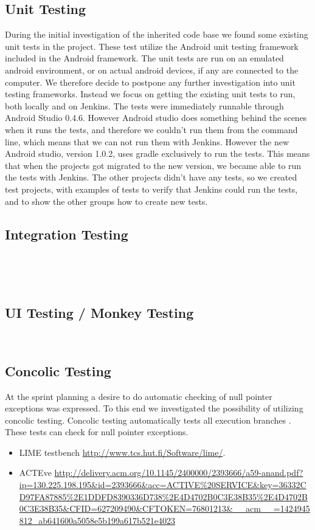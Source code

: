 \subsection{Unit Testing}
During the initial investigation of the inherited code base we found some existing unit tests in the  project. These test utilize the Android unit testing framework included in the Android framework\parencite{AndroidUnit}. The unit tests are run on an emulated android environment, or on actual android devices, if any are connected to the computer. We therefore decide to postpone any further investigation into unit testing frameworks. Instead we focus on getting the existing unit tests to run, both locally and on Jenkins. The tests were immediately runnable through Android Studio 0.4.6. However Android studio does something behind the scenes when it runs the tests, and therefore we couldn't run them from the command line, which means that we can not run them with Jenkins. However the new Android studio, version 1.0.2, uses gradle exclusively to run the tests. This means that when the projects got migrated to the new version, we became able to run the tests with Jenkins. 
The other projects didn't have any tests, so we created test projects, with examples of tests to verify that Jenkins could run the tests, and to show the other groups how to create new tests. 
\subsection{Integration Testing}
\dummy~\dummy~\dummy

\dummy~\dummy~\dummy~
\subsection{UI Testing / Monkey Testing}
\dummy~\dummy~\dummy~\dummy~\dummy~\dummy~
\subsection{Concolic Testing}
At the sprint planning a desire to do automatic checking of null pointer exceptions was expressed. To this end we investigated the possibility of utilizing concolic testing. Concolic testing automatically tests all execution branches \parencite{concolic_testing_2015}. These tests can check for null pointer exceptions.


\begin{itemize}
  \item LIME testbench \url{http://www.tcs.hut.fi/Software/lime/}.
  \item ACTEve \url{http://delivery.acm.org/10.1145/2400000/2393666/a59-anand.pdf?ip=130.225.198.195&id=2393666&acc=ACTIVE%20SERVICE&key=36332CD97FA87885%2E1DDFD8390336D738%2E4D4702B0C3E38B35%2E4D4702B0C3E38B35&CFID=627209490&CFTOKEN=76801213&__acm__=1424945812_ab641600a5058e5b199a617b521e4023}
\end{itemize}

